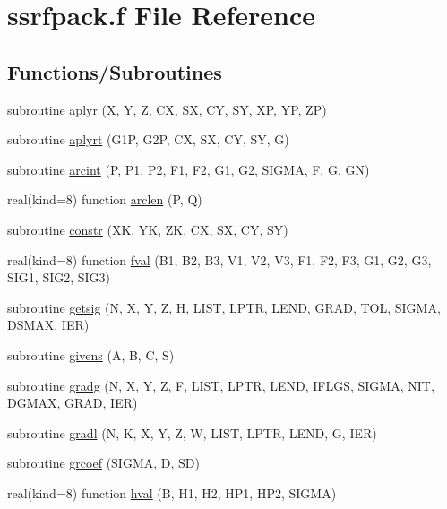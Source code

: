 \hypertarget{ssrfpack_8f}{\section{ssrfpack.\+f File Reference}
\label{ssrfpack_8f}
}
\subsection*{Functions/\+Subroutines}
\begin{DoxyCompactItemize}
\item 
subroutine \hyperlink{ssrfpack_8f_a7af2b05f5f39a731eaa445835b3ae222}{aplyr} (X, Y, Z, C\+X, S\+X, C\+Y, S\+Y, X\+P, Y\+P, Z\+P)
\item 
subroutine \hyperlink{ssrfpack_8f_a5920dabba1201b7456ea9d596798ce55}{aplyrt} (G1\+P, G2\+P, C\+X, S\+X, C\+Y, S\+Y, G)
\item 
subroutine \hyperlink{ssrfpack_8f_a45a8de2e9c38a5cc5f45f97849df4255}{arcint} (P, P1, P2, F1, F2, G1, G2, S\+I\+G\+M\+A, F, G, G\+N)
\item 
real(kind=8) function \hyperlink{ssrfpack_8f_a4e8193a569c3c5332f0698c3fafd3b72}{arclen} (P, Q)
\item 
subroutine \hyperlink{ssrfpack_8f_a1dc81986d498464b334b7c40ce4780d7}{constr} (X\+K, Y\+K, Z\+K, C\+X, S\+X, C\+Y, S\+Y)
\item 
real(kind=8) function \hyperlink{ssrfpack_8f_a1f102b1ccb6483cd32eb912fee1d8851}{fval} (B1, B2, B3, V1, V2, V3, F1, F2, F3, G1, G2, G3, S\+I\+G1, S\+I\+G2, S\+I\+G3)
\item 
subroutine \hyperlink{ssrfpack_8f_a733c51bf1be25175f21051cee9759312}{getsig} (N, X, Y, Z, H, L\+I\+S\+T, L\+P\+T\+R, L\+E\+N\+D, G\+R\+A\+D, T\+O\+L, S\+I\+G\+M\+A, D\+S\+M\+A\+X, I\+E\+R)
\item 
subroutine \hyperlink{ssrfpack_8f_a909dfda233ff73d5abda9f22e401bd83}{givens} (A, B, C, S)
\item 
subroutine \hyperlink{ssrfpack_8f_a52dd5752fd3d5974fa1e213c5913cd72}{gradg} (N, X, Y, Z, F, L\+I\+S\+T, L\+P\+T\+R, L\+E\+N\+D, I\+F\+L\+G\+S, S\+I\+G\+M\+A, N\+I\+T, D\+G\+M\+A\+X, G\+R\+A\+D, I\+E\+R)
\item 
subroutine \hyperlink{ssrfpack_8f_a635256785689ea4bc34812b361083a74}{gradl} (N, K, X, Y, Z, W, L\+I\+S\+T, L\+P\+T\+R, L\+E\+N\+D, G, I\+E\+R)
\item 
subroutine \hyperlink{ssrfpack_8f_a42b93aa164cecdff6abe438048ba8038}{grcoef} (S\+I\+G\+M\+A, D, S\+D)
\item 
real(kind=8) function \hyperlink{ssrfpack_8f_a7f8cb60d2016b09d2fbfee9f7a144378}{hval} (B, H1, H2, H\+P1, H\+P2, S\+I\+G\+M\+A)

\end{DoxyCompactItemize}
